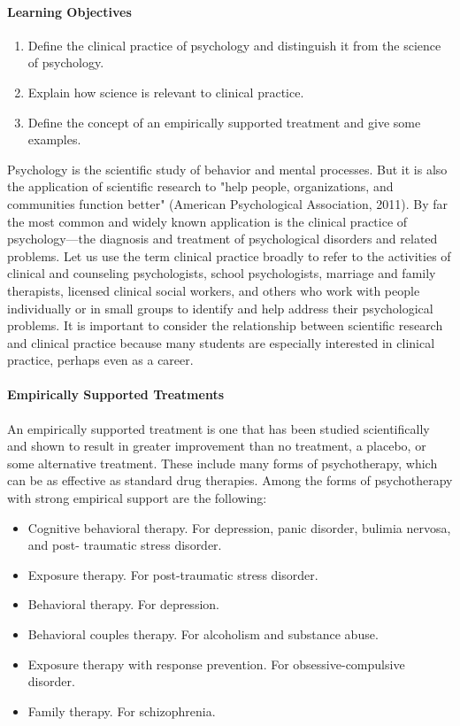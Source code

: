 \paragraph{Learning Objectives}

\begin{enumerate}
\item Define the clinical practice of psychology and distinguish it from the science of psychology.
\item Explain how science is relevant to clinical practice.
\item Define the concept of an empirically supported treatment and give some examples.
\end{enumerate}


Psychology is the scientific study of behavior and mental processes. But it is also the application of scientific research to "help people, organizations, and communities function better" (American Psychological Association, 2011). By far the most common and widely known application is the clinical practice of psychology---the diagnosis and treatment of psychological disorders and related problems. Let us use the term clinical practice broadly to refer to the activities of clinical and counseling psychologists, school psychologists, marriage and family therapists, licensed clinical social workers, and others who work with people individually or in small groups to identify and help address their psychological problems. It is important to consider the relationship between scientific research and clinical practice because many students are especially interested in clinical practice, perhaps even as a career.

\paragraph{Empirically Supported Treatments}

An empirically supported treatment is one that has been studied scientifically and shown to result in greater improvement than no treatment, a placebo, or some alternative treatment. These include many forms of psychotherapy, which can be as effective as standard drug therapies. Among the forms of psychotherapy with strong empirical support are the following:

\begin{itemize}
\item Cognitive behavioral therapy. For depression, panic disorder, bulimia nervosa, and post- traumatic stress disorder.
\item Exposure therapy. For post-traumatic stress disorder.
\item Behavioral therapy. For depression.
\item Behavioral couples therapy. For alcoholism and substance abuse.
\item Exposure therapy with response prevention. For obsessive-compulsive disorder.
\item Family therapy. For schizophrenia.
\end{itemize}

